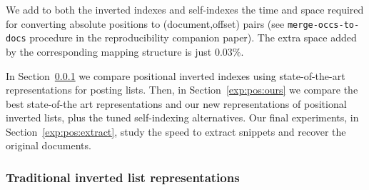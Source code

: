 \documentclass[review]{elsarticle}
\begin{document}
We add to both 
the inverted indexes and self-indexes the time and space required for 
converting absolute positions to (document,offset) pairs (see {\tt merge-occs-to-docs} procedure in the
reproducibility companion paper). 
The extra space added by the corresponding mapping structure is just 0.03\%.

In Section~\ref{exp:pos:others} we compare positional inverted indexes using 
state-of-the-art representations for posting lists. 
Then, in Section~\ref{exp:pos:ours} we compare the best
state-of-the art representations and our new representations of positional
inverted lists, plus the tuned self-indexing alternatives.
%
Our final experiments, in Section~\ref{exp:pos:extract}, study the speed to
extract snippets and recover the original documents.

\subsubsection{Traditional inverted list representations} \label{exp:pos:others}
\end{document}
